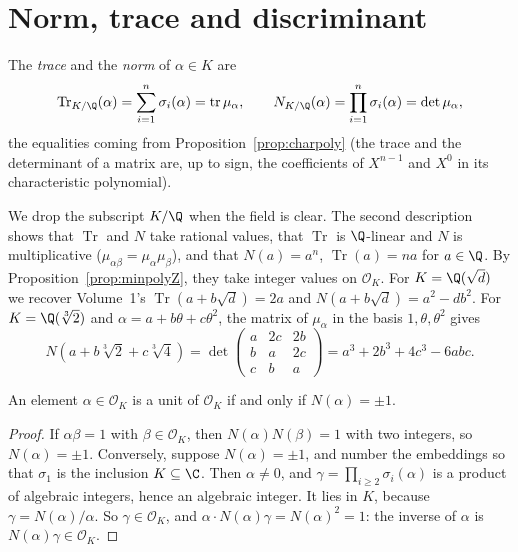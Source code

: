 \section{Norm, trace and discriminant}

\begin{definition}
The \emph{trace} and the \emph{norm} of $\alpha\in K$ are
\[
\operatorname{Tr}_{K/\Q}(\alpha)=\sum_{i=1}^n\sigma_i(\alpha)=\operatorname{tr}\mu_\alpha,\qquad
N_{K/\Q}(\alpha)=\prod_{i=1}^n\sigma_i(\alpha)=\det\mu_\alpha,
\]
the equalities coming from Proposition~\ref{prop:charpoly} (the trace and the determinant of a matrix are, up to sign,
the coefficients of $X^{n-1}$ and $X^0$ in its characteristic polynomial).
\end{definition}

We drop the subscript $K/\Q$ when the field is clear. The second description shows that $\operatorname{Tr}$ and $N$
take rational values, that $\operatorname{Tr}$ is $\Q$-linear and $N$ is multiplicative ($\mu_{\alpha\beta}=
\mu_\alpha\mu_\beta$), and that $N(a)=a^n$, $\operatorname{Tr}(a)=na$ for $a\in\Q$. By
Proposition~\ref{prop:minpolyZ}, they take integer values on $\mathcal O_K$. For $K=\Q(\sqrt d)$ we recover Volume~1's
$\operatorname{Tr}(a+b\sqrt d)=2a$ and $N(a+b\sqrt d)=a^2-db^2$. For $K=\Q(\sqrt[3]2)$ and $\alpha=a+b\theta+c\theta^2$,
the matrix of $\mu_\alpha$ in the basis $1,\theta,\theta^2$ gives
\[
N(a+b\sqrt[3]2+c\sqrt[3]4)=\det\begin{pmatrix}a&2c&2b\\b&a&2c\\c&b&a\end{pmatrix}=a^3+2b^3+4c^3-6abc.
\]

\begin{proposition}\label{prop:units}
An element $\alpha\in\mathcal O_K$ is a unit of $\mathcal O_K$ if and only if $N(\alpha)=\pm1$.
\end{proposition}
\begin{proof}
If $\alpha\beta=1$ with $\beta\in\mathcal O_K$, then $N(\alpha)N(\beta)=1$ with two integers, so $N(\alpha)=\pm1$.
Conversely, suppose $N(\alpha)=\pm1$, and number the embeddings so that $\sigma_1$ is the inclusion $K\subseteq\C$.
Then $\alpha\ne0$, and $\gamma=\prod_{i\ge2}\sigma_i(\alpha)$ is a product of algebraic integers, hence an algebraic
integer. It lies in $K$, because $\gamma=N(\alpha)/\alpha$. So $\gamma\in\mathcal O_K$, and $\alpha\cdot N(\alpha)\gamma=
N(\alpha)^2=1$: the inverse of $\alpha$ is $N(\alpha)\gamma\in\mathcal O_K$.
\end{proof}

